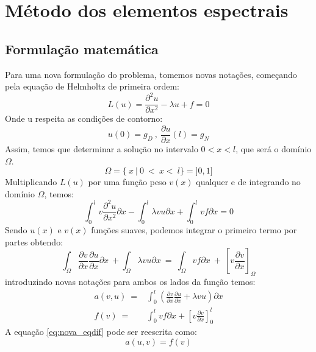 \chapter{Método dos elementos espectrais}
\label{cap:II}

\section{Formulação matemática}
 Para uma nova formulação do problema, tomemos novas notações, começando pela equação de Helmholtz de primeira ordem:
\begin{equation}
 L(u) = \frac{\partial^2 u}{\partial x^2} - \lambda u + f = 0
\end{equation}
 Onde u respeita as condições de contorno:\\
\begin{equation}
 u(0) = g_D \ , \ \frac{\partial u}{\partial x}(l) = g_N
\end{equation}
 Assim, temos que determinar a solução no intervalo $ 0 < x < l$, que será o domínio $\Omega$.
\begin{equation}
 \Omega = \{\ x\ |\ 0\ <\ x <\ l\} = ]0,1]
\end{equation}
 Multiplicando $L(u)$ por uma função peso $v(x)$ qualquer e de integrando no domínio $\Omega$, temos:
 \begin{equation}
 \int^{l}_0 v \frac{\partial^2 u}{\partial x^2} \partial x - \int^{l}_0 \lambda v u \partial x + \int^{l}_0 v f \partial x = 0
 \end{equation}
 Sendo $u(x)$ e $v(x)$ funções suaves, podemos integrar o primeiro termo por partes obtendo:
 \begin{equation}\label{eq:nova_eqdif}
 \int_\Omega \frac{\partial v}{\partial x} \frac{\partial u}{\partial x} \partial x\ + \int_\Omega \lambda v u \partial x\ =\ \int_\Omega vf \partial x\ +\ \left[ v \frac{\partial v}{\partial x} \right]_\Omega
 \end{equation}
 introduzindo novas notações para ambos os lados da função temos: 
\begin{align}
 a(v,u)\ = & \int^l_{0} \left(\frac{\partial v}{\partial x}\frac{\partial u}{\partial x} + \lambda v u\right) \partial x\\
 f(v)\ = & \int^{l}_0 v f \partial x + \left[v \frac{\partial v}{\partial x}\right]^{l}_{0} 
\end{align}
 A equação \ref{eq:nova_eqdif} pode ser reescrita como:
 \begin{equation}
 a(u,v) = f(v)
 \end{equation}
